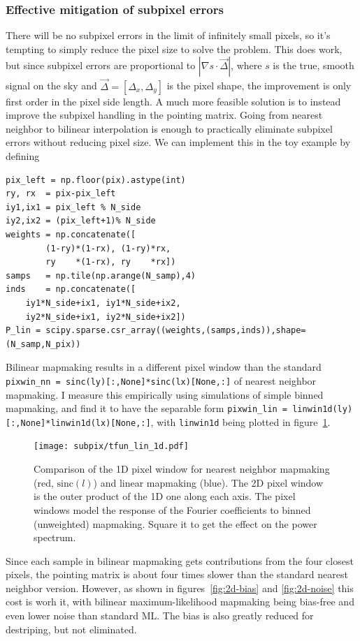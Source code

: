 \documentclass[twocolumn,apj]{aastex63}
\begin{document}
\subsubsection{Effective mitigation of subpixel errors}
There will be no subpixel errors in the limit of infinitely small pixels,
so it's tempting to simply reduce the pixel size to solve the problem. This
does work, but since subpixel errors are proportional to $|\nabla s \cdot \vec \Delta|$,
where $s$ is the true, smooth signal on the sky and $\vec \Delta = [\Delta_x,\Delta_y]$
is the pixel shape, the improvement is only first order in the pixel side length.
A much more feasible solution is to instead improve the subpixel handling in the
pointing matrix. Going from nearest neighbor to bilinear interpolation is enough
to practically eliminate subpixel errors without reducing pixel size. We can
implement this in the toy example by defining
\begin{lstlisting}
pix_left = np.floor(pix).astype(int)
ry, rx  = pix-pix_left
iy1,ix1 = pix_left % N_side
iy2,ix2 = (pix_left+1)% N_side
weights = np.concatenate([
		(1-ry)*(1-rx), (1-ry)*rx,
		ry    *(1-rx), ry    *rx])
samps   = np.tile(np.arange(N_samp),4)
inds    = np.concatenate([
	iy1*N_side+ix1, iy1*N_side+ix2,
	iy2*N_side+ix1, iy2*N_side+ix2])
P_lin = scipy.sparse.csr_array((weights,(samps,inds)),shape=(N_samp,N_pix))
\end{lstlisting}
Bilinear mapmaking results in a different pixel window than
the standard \lstinline{pixwin_nn = sinc(ly)[:,None]*sinc(lx)[None,:]}
of nearest neighbor mapmaking. I measure this empirically using simulations
of simple binned mapmaking, and find it to have the separable form
\lstinline{pixwin_lin = linwin1d(ly)[:,None]*linwin1d(lx)[None,:]},
with \lstinline{linwin1d} being plotted in figure~\ref{fig:linwin1d}.

\begin{figure}
	\centering
	\texttt{[image: subpix/tfun\_lin\_1d.pdf]}
	\caption{Comparison of the 1D pixel window for nearest neighbor
	mapmaking (red, $\text{sinc}(l)$) and linear mapmaking (blue). The 2D pixel window
	is the outer product of the 1D one along each axis. The pixel
	windows model the response of the Fourier coefficients to
	binned (unweighted) mapmaking. Square it to get the effect on
	the power spectrum.}
	\label{fig:linwin1d}
\end{figure}

Since each sample in bilinear mapmaking gets contributions from the four closest pixels,
the pointing matrix is about four times slower than the standard nearest neighbor
version. However, as shown in figures~\ref{fig:2d-bias} and \ref{fig:2d-noise}
this cost is worh it, with bilinear maximum-likelihood mapmaking being bias-free
and even lower noise than standard ML. The bias is also greatly reduced for
destriping, but not eliminated.
\end{document}
